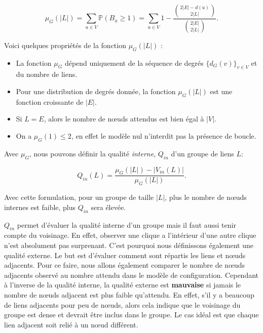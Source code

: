 \begin{equation}
\label{eq:nbsommet_esp} \mu_{G}(|L|) = \sum_{u\in V} \mathbb{P}( B_u \geq 1 )
=  \sum_{u \in V} 1 - \dfrac{ \binom{2|E|-d(u)}{2|L|} }{ \binom{2|E|}{2|L|} }. 
\end{equation}

Voici quelques propriétés de la fonction $\mu_{G}(|L|)$ :
\begin{itemize}
\item La fonction $\mu_{G}$ dépend uniquement de la séquence de degrés $\{d_G(v)\}_{v \in V}$ et du nombre de liens.
\item Pour une distribution de degrés donnée, la fonction   $\mu_{G}(|L|)$ est une fonction croissante de $|E|$.
\item Si $L=E$, alors le nombre de n\oe{}uds attendus est bien égal à $|V|$.
\item On a $\mu_{G}(1)\leq 2$, en effet le modèle nul n'interdit pas la présence de boucle.
\end{itemize}

Avec $\mu_G$, nous pouvons définir la qualité \emph{interne}, $Q_{in}$ d'un groupe de liens $L$:
  
\begin{equation}
\label{eq:qin} Q_{in}(L) = \dfrac{\mu_{G}(|L|) - |V_{in}(L)|}{\mu_{G}(|L|)}.
\end{equation}

Avec cette formulation, pour un groupe de taille $|L|$, plus le nombre de n\oe{}uds internes est faible, plus $Q_{in}$ sera élevée.

$Q_{in}$ permet d'évaluer la qualité interne d'un groupe mais il faut aussi tenir compte du voisinage.
En effet, observer une clique a l'intérieur d'une autre clique n'est absolument pas surprenant.
C'est pourquoi nous définissons également une qualité externe.
Le but est d'évaluer comment sont répartis les liens et n\oe{}uds adjacents.
Pour ce faire, nous allons également comparer le nombre de n\oe{}uds adjacents observé au nombre attendu dans le modèle de configuration.
Cependant à l'inverse de la qualité interne, la qualité externe est \textbf{mauvaise} si jamais le nombre de n\oe{}uds adjacent est plus faible qu'attendu.
En effet, s'il y a beaucoup de liens adjacents pour peu de n\oe{}uds, alors cela indique que le voisinage du groupe est dense et devrait être inclus dans le groupe.
Le cas idéal est que chaque lien adjacent soit relié à un n\oe{}ud différent.

